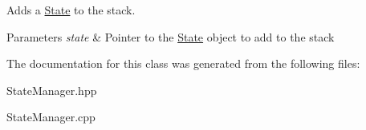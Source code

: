 Adds a \mbox{\hyperlink{class_state}{State}} to the stack. 


\begin{DoxyParams}{Parameters}
{\em state} & Pointer to the \mbox{\hyperlink{class_state}{State}} object to add to the stack \\
\hline
\end{DoxyParams}


The documentation for this class was generated from the following files\+:\begin{DoxyCompactItemize}
\item 
State\+Manager.\+hpp\item 
State\+Manager.\+cpp\end{DoxyCompactItemize}
